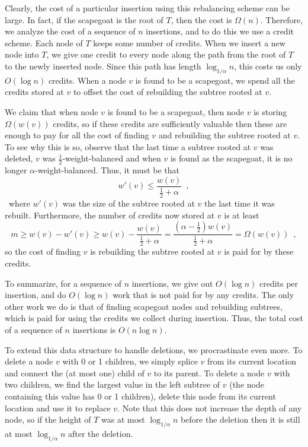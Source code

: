 Clearly, the cost of a particular insertion using this rebalancing
scheme can be large.  In fact, if the scapegoat is the root of $T$,
then the cost is $\Omega(n)$.  Therefore, we analyze the cost of a
sequence of $n$ insertions, and to do this we use a credit scheme.
Each node of $T$ keeps some number of credits.  When we insert a new
node into $T$, we give one credit to every node along the path from
the root of $T$ to the newly inserted node.  Since this path has
length $\log_{1/\alpha} n$, this costs us only $O(\log n)$ credits.
When a node $v$ is found to be a scapegoat, we spend all the credits
stored at $v$ to offset the cost of rebuilding the subtree rooted at
$v$.  

We claim that when node $v$ is found to be a scapegoat, then node $v$
is storing $\Omega(w(v))$ credits, so if these credits are
sufficiently valuable then these are enough to pay for all the cost of
finding $v$ and rebuilding the subtree rooted at $v$.  To see why this
is so, observe that the last time a subtree rooted at $v$ was deleted,
$v$ was $\frac{1}{2}$-weight-balanced and when $v$ is found as the
scapegoat, it is no longer $\alpha$-weight-balanced.  Thus, it must
be that
\[  w'(v) \le \frac{w(v)}{\frac{1}{2}+\alpha} \enspace ,\]\
where $w'(v)$ was the size of the subtree rooted at $v$ the last time
it was rebuilt.  Furthermore, the number of credits now stored at $v$
is at least
\[  m \ge w(v)-w'(v) \ge w(v) - \frac{w(v)}{\frac{1}{2}+\alpha} = 
\frac{(\alpha-\frac{1}{2})w(v)}{\frac{1}{2}+\alpha} = \Omega(w(v)) \enspace , \]so the cost of finding $v$ is rebuilding the subtree rooted at $v$
is paid for by these credits.

To summarize, for a sequence of $n$ insertions, we give out $O(\log
n)$ credits per insertion, and do $O(\log n)$ work that is not paid
for by any credits.  The only other work we do is that of finding
scapegoat nodes and rebuilding subtrees, which is paid for using the
credits we collect during insertion.  Thus, the total cost of a
sequence of $n$ insertions is $O(n \log n)$.

To extend this data structure to handle deletions, we procrastinate
even more.  To delete a node $v$ with 0 or 1 children, we simply
splice $v$ from its current location and connect the (at most one)
child of $v$ to its parent.  To delete a node $v$ with two children,
we find the largest value in the left subtree of $v$ (the node
containing this value has 0 or 1 children), delete this node from its
current location and use it to replace $v$.  Note that this does not
increase the depth of any node, so if the height of $T$ was at most
$\log_{1/\alpha} n$ before the deletion then it is still at most
$\log_{1/\alpha} n$ after the deletion.

